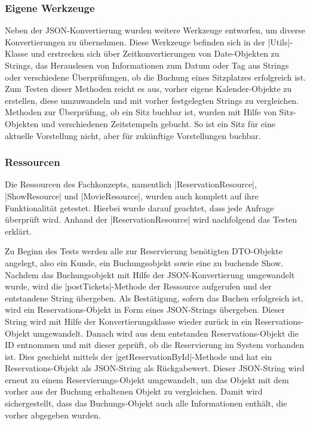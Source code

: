 \subsubsection{Eigene Werkzeuge}

Neben der \acs{JSON}-Konvertierung wurden weitere Werkzeuge entworfen, um diverse Konvertierungen zu übernehmen.
Diese Werkzeuge befinden sich in der \jinline |Utils|-Klasse und erstrecken sich über Zeitkonvertierungen von Date-Objekten zu Strings, das Herauslesen von Informationen zum Datum oder Tag aus Strings oder verschiedene Überprüfungen, ob die Buchung eines Sitzplatzes erfolgreich ist.
Zum Testen dieser Methoden reicht es aus, vorher eigene Kalender-Objekte zu erstellen, diese umzuwandeln und mit vorher festgelegten Strings zu vergleichen.
Methoden zur Überprüfung, ob ein Sitz buchbar ist, wurden mit Hilfe von Sitz-Objekten und verschiedenen Zeitstempeln gebucht.
So ist ein Sitz für eine aktuelle Vorstellung nicht, aber für zukünftige Vorstellungen buchbar.

\subsubsection{Ressourcen}
Die Ressourcen des Fachkonzepts, namentlich \jinline|ReservationResource|, \jinline|ShowResource| und \jinline|MovieResource|, wurden auch komplett auf ihre Funktionalität getestet.
Hierbei wurde darauf geachtet, dass jede Anfrage überprüft wird.
Anhand der \jinline |ReservationResource| wird nachfolgend das Testen erklärt.

Zu Beginn des Tests werden alle zur Reservierung benötigten \acs{DTO}-Objekte angelegt, also ein Kunde, ein Buchungsobjekt sowie eine zu buchende Show.
Nachdem das Buchungsobjekt mit Hilfe der \acs{JSON}-Konvertierung umgewandelt wurde, wird die \jinline |postTickets|-Methode der Ressource aufgerufen und der entstandene String übergeben.
Als Bestätigung, sofern das Buchen erfolgreich ist, wird ein Reservations-Objekt in Form eines \acs{JSON}-Strings übergeben.
Dieser String wird mit Hilfe der Konvertierungsklasse wieder zurück in ein Reservations-Objekt umgewandelt.
Danach wird aus dem entstanden Reservations-Objekt die ID entnommen und mit dieser geprüft, ob die Reservierung im System vorhanden ist.
Dies geschieht mittels der \jinline |getReservationById|-Methode und hat ein Reservations-Objekt als \acs{JSON}-String als Rückgabewert.
Dieser \acs{JSON}-String wird erneut zu einem Reservierungs-Objekt umgewandelt, um das Objekt mit dem vorher aus der Buchung erhaltenen Objekt zu vergleichen.
Damit wird sichergestellt, dass das Buchungs-Objekt auch alle Informationen enthält, die vorher abgegeben wurden.

